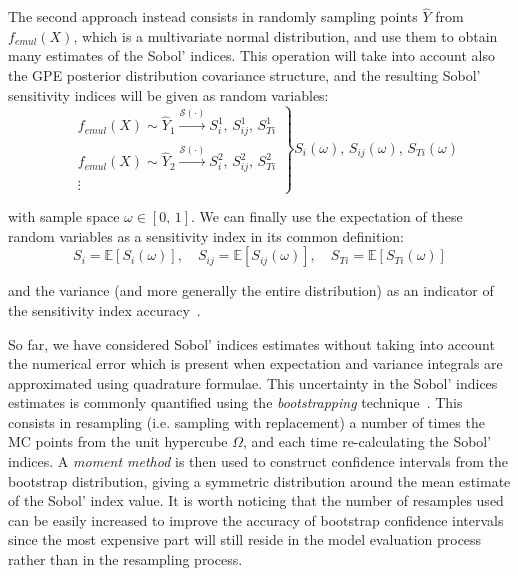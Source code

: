 \noindent
The second approach instead consists in randomly sampling points $\hat{Y}$ from $f_{emul}(X)$, which is a multivariate normal distribution, and use them to obtain many estimates of the Sobol' indices. This operation will take into account also the GPE posterior distribution covariance structure, and the resulting Sobol' sensitivity indices will be given as random variables:
%
\begin{equation}\label{eq:emulpostsamplesgsa1}
    \left.
        \begin{array}{ll}
            & f_{emul}(X)\sim\hat{Y}_1\xrightarrow[]{\mathcal{S}(\cdot)} S_{i}^{1},\,S_{ij}^{1},\,S_{Ti}^{1} \\
            & f_{emul}(X)\sim\hat{Y}_2\xrightarrow[]{\mathcal{S}(\cdot)} S_{i}^{2},\,S_{ij}^{2},\,S_{Ti}^{2} \\
            & \vdots
        \end{array}
    \right\}S_i(\omega),\,S_{ij}(\omega),\,S_{Ti}(\omega)
\end{equation}

\noindent
with sample space $\omega\in [0,\,1]$. We can finally use the expectation of these random variables as a sensitivity index in its common definition:
%
\begin{equation}\label{eq:emulpostsamplesgsa2}
    S_{i} = \mathbb{E}[S_i(\omega)],\quad S_{ij} = \mathbb{E}[S_{ij}(\omega)],\quad S_{Ti} = \mathbb{E}[S_{Ti}(\omega)]
\end{equation}

\noindent
and the variance (and more generally the entire distribution) as an indicator of the sensitivity index accuracy~\cite{Marrel:2009}.

\vspace{0.2cm}
So far, we have considered Sobol' indices estimates without taking into account the numerical error which is present when expectation and variance integrals are approximated using quadrature formulae. This uncertainty in the Sobol' indices estimates is commonly quantified using the \textit{bootstrapping} technique~\cite{Archer:1997}. This consists in resampling (i.e. sampling with replacement) a number of times the MC points from the unit hypercube $\Omega$, and each time re-calculating the Sobol' indices. A \textit{moment method} is then used to construct confidence intervals from the bootstrap distribution, giving a symmetric distribution around the mean estimate of the Sobol' index value. It is worth noticing that the number of resamples used can be easily increased to improve the accuracy of bootstrap confidence intervals since the most expensive part will still reside in the model evaluation process rather than in the resampling process.

